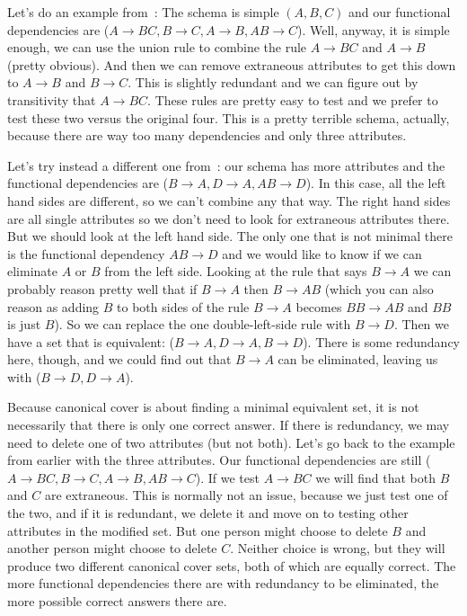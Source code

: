 Let's do an example from~\cite{dsc}: The schema is simple $(A, B, C)$ and our functional dependencies are ($A \rightarrow BC, B \rightarrow C, A \rightarrow B, AB \rightarrow C$). Well, anyway, it is simple enough, we can use the union rule to combine the rule $A \rightarrow BC$ and $A \rightarrow B$ (pretty obvious). And then we can remove extraneous attributes to get this down to $A \rightarrow B$ and $B \rightarrow C$. This is slightly redundant and we can figure out by transitivity that $A \rightarrow BC$. These rules are pretty easy to test and we prefer to test these two versus the original four. This is a pretty terrible schema, actually, because there are way too many dependencies and only three attributes. 

Let's try instead a different one from~\cite{fds}: our schema has more attributes and the functional dependencies are ($B \rightarrow A, D \rightarrow A, AB \rightarrow D$). In this case, all the left hand sides are different, so we can't combine any that way. The right hand sides are all single attributes so we don't need to look for extraneous attributes there. But we should look at the left hand side. The only one that is not minimal there is the functional dependency $AB \rightarrow D$ and we would like to know if we can eliminate $A$ or $B$ from the left side. Looking at the rule that says $B \rightarrow A$ we can probably reason pretty well that if $B \rightarrow A$ then $B \rightarrow AB$  (which you can also reason as adding $B$ to both sides of the rule $B \rightarrow A$ becomes $BB \rightarrow AB$ and $BB$ is just $B$). So we can replace the one double-left-side rule with $B \rightarrow D$. Then we have a set that is equivalent: ($B \rightarrow A, D \rightarrow A, B \rightarrow D$). There is some redundancy here, though, and we could find out that $B \rightarrow A$ can be eliminated, leaving us with ($B \rightarrow D, D \rightarrow A$).

Because canonical cover is about finding a minimal equivalent set, it is not necessarily that there is only one correct answer. If there is redundancy, we may need to delete one of two attributes (but not both). Let's go back to the example from earlier with the three attributes. Our functional dependencies are still ($A \rightarrow BC, B \rightarrow C, A \rightarrow B, AB \rightarrow C$). If we test $A \rightarrow BC$ we will find that both $B$ and $C$ are extraneous. This is normally not an issue, because we just test one of the two, and if it is redundant, we delete it and move on to testing other attributes in the modified set. But one person might choose to delete $B$ and another person might choose to delete $C$. Neither choice is wrong, but they will produce two different canonical cover sets, both of which are equally correct. The more functional dependencies there are with redundancy to be eliminated, the more possible correct answers there are. 


